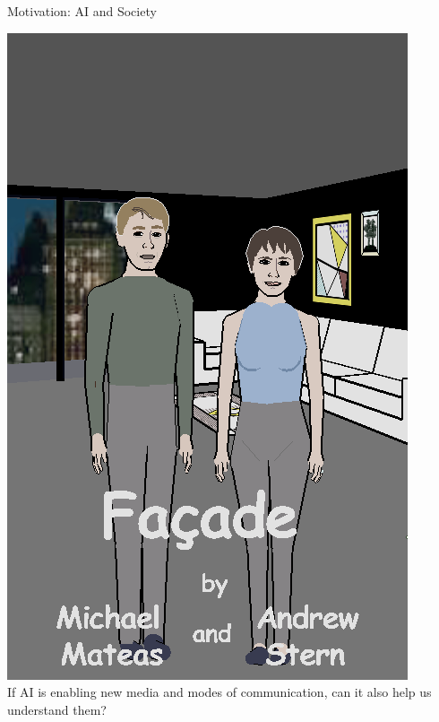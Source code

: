 \documentclass[xcolor=x11names]{beamer}
\begin{document}
\begin{frame}{Motivation: AI and Society}
\begin{center}
  \includegraphics[height=0.4\textheight]{res/facade-title.png} \\
  \vspace{1em}
  If AI is enabling new media and modes of communication, can it also help us understand them?
\end{center}
\end{frame}
\end{document}
